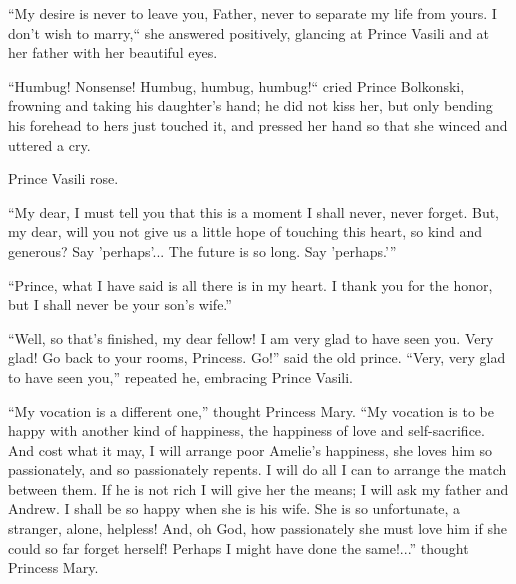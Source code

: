 ``My desire is never to leave you, Father, never to separate my
life from yours. I don't wish to marry,`` she answered
positively, glancing at Prince Vasili and at her father with her
beautiful eyes.

``Humbug! Nonsense! Humbug, humbug, humbug!`` cried Prince
Bolkonski, frowning and taking his daughter's hand; he did not
kiss her, but only bending his forehead to hers just touched it,
and pressed her hand so that she winced and uttered a cry.

Prince Vasili rose.

``My dear, I must tell you that this is a moment I shall never,
never forget. But, my dear, will you not give us a little hope of
touching this heart, so kind and generous? Say 'perhaps'... The
future is so long. Say 'perhaps.'{}''

``Prince, what I have said is all there is in my heart. I thank
you for the honor, but I shall never be your son's wife.''

``Well, so that's finished, my dear fellow! I am very glad to
have seen you. Very glad! Go back to your rooms, Princess. Go!''
said the old prince. ``Very, very glad to have seen you,''
repeated he, embracing Prince Vasili.

``My vocation is a different one,'' thought Princess Mary. ``My
vocation is to be happy with another kind of happiness, the
happiness of love and self-sacrifice. And cost what it may, I
will arrange poor Amelie's happiness, she loves him so
passionately, and so passionately repents. I will do all I can to
arrange the match between them. If he is not rich I will give her
the means; I will ask my father and Andrew. I shall be so happy
when she is his wife. She is so unfortunate, a stranger, alone,
helpless! And, oh God, how passionately she must love him if she
could so far forget herself! Perhaps I might have done the
same!...'' thought Princess Mary.



